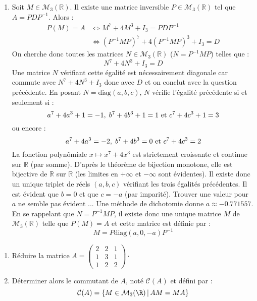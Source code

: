 \documentclass[a4paper,10pt]{report}
\begin{document}
\begin{enumerate}
\item Soit $M \in \mathcal{M}_3(\mathbb{R})$. Il existe une matrice inversible $P \in \mathcal{M}_3(\mathbb{R})$ tel que $A=PDP^{-1}$. Alors :
\begin{align*}
P(M) =A & \Longleftrightarrow M^7+4M^3 + I_3 = PDP^{-1} \\
& \Longleftrightarrow (P^{-1}MP)^7 + 4(P^{-1}MP)^3+ I_3 = D 
\end{align*}
On cherche donc toutes les matrices $N \in \mathcal{M}_3(\mathbb{R})$ ($N=P^{-1}MP$) telles que :
$$ N^7+4N^3+I_3=D$$
Une matrice $N$ vérifiant cette égalité est nécessairement diagonale car commute avec $N^7+4N^3+I_3$ donc avec $D$ et on conclut avec la question précédente. En posant $N= \textrm{diag}(a,b,c)$, $N$ vérifie l'égalité précédente si et seulement si :
$$ a^7+ 4a^3+1= -1, \; b^7+ 4b^3+1= 1 \hbox{ et } c^7+ 4c^3+1= 3 $$
ou encore :
$$ a^7+ 4a^3= -2, \; b^7+ 4b^3= 0 \hbox{ et } c^7+ 4c^3= 2 $$
La fonction polynômiale $x \mapsto x^7+4x^3$ est strictement croissante et continue sur $\mathbb{R}$ (par somme). D'après le théorème de bijection monotone, elle est bijective de $\mathbb{R}$ sur $\mathbb{R}$ (les limites en $+ \infty$ et $- \infty$ sont évidentes). Il existe donc un unique triplet de réels $(a,b,c)$ vérifiant les trois égalités précédentes. Il est évident que $b=0$ et que $c=-a$ (par imparité). Trouver une valeur pour $a$ ne semble pas évident ... Une méthode de dichotomie donne $a \approx -0.771557$. En se rappelant que $N=P^{-1}MP$, il existe donc une unique matrice $M$ de $\mathcal{M}_3(\mathbb{R})$ telle que $P(M)=A$ et cette matrice est définie par :
$$ M = P \textrm{diag}(a,0,-a) P^{-1}$$
\end{enumerate}

\begin{Exa}
\begin{enumerate}
\item R\'eduire la matrice $A= \left(\begin{array}{rrr}  2 & 2 & 1\\
1 & 3 & 1\\
1 & 2 & 2 \end{array}\right) \cdot $\\
\item Déterminer alors le commutant de $A$, noté $\mathcal{C}(A)$ et défini par : 
$${\cal C}(A)=\{M\in{\cal M}_3(\R) \, \vert \, AM=MA\}$$
\end{enumerate}
\end{Exa} 

\corr 
\end{document}
